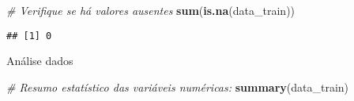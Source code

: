 \documentclass[
]{article}
\newenvironment{Shaded}{\begin{snugshade}}{\end{snugshade}}
\newcommand{\CommentTok}[1]{\textcolor[rgb]{0.56,0.35,0.01}{\textit{#1}}}
\newcommand{\FunctionTok}[1]{\textcolor[rgb]{0.13,0.29,0.53}{\textbf{#1}}}
\newcommand{\NormalTok}[1]{#1}
\begin{document}
\begin{Shaded}
\begin{Highlighting}[]
\CommentTok{\# Verifique se há valores ausentes}
\FunctionTok{sum}\NormalTok{(}\FunctionTok{is.na}\NormalTok{(data\_train))}
\end{Highlighting}
\end{Shaded}

\begin{verbatim}
## [1] 0
\end{verbatim}

Análise dados

\begin{Shaded}
\begin{Highlighting}[]
\CommentTok{\# Resumo estatístico das variáveis numéricas:}
\FunctionTok{summary}\NormalTok{(data\_train)}
\end{Highlighting}
\end{Shaded}
\end{document}
